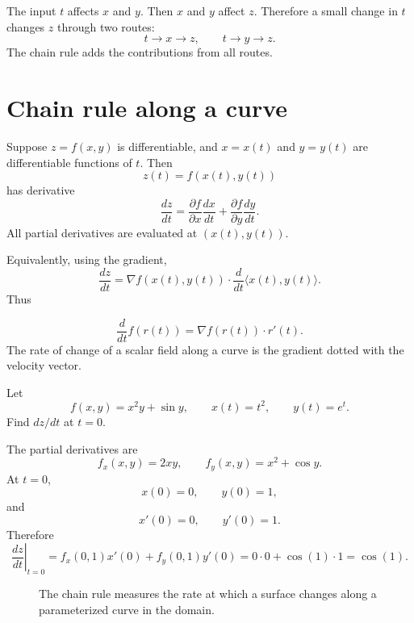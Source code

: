 \documentclass[11pt]{article}
\newcommand{\grad}{\nabla}
\begin{document}
The input $t$ affects $x$ and $y$. Then $x$ and $y$ affect $z$. Therefore a small change in $t$ changes $z$ through two routes:
\[
t\to x\to z,\qquad t\to y\to z.
\]
The chain rule adds the contributions from all routes.

\section{Chain rule along a curve}

Suppose $z=f(x,y)$ is differentiable, and $x=x(t)$ and $y=y(t)$ are differentiable functions of $t$. Then
\[
z(t)=f(x(t),y(t))
\]
has derivative
\[
\frac{dz}{dt}=\frac{\partial f}{\partial x}\frac{dx}{dt}+\frac{\partial f}{\partial y}\frac{dy}{dt}.
\]
All partial derivatives are evaluated at $(x(t),y(t))$.

Equivalently, using the gradient,
\[
\frac{dz}{dt}=\grad f(x(t),y(t))\cdot \frac{d}{dt}\langle x(t),y(t)\rangle.
\]
Thus
\begin{formulabox}
\[
\boxed{\frac{d}{dt}f(r(t))=\grad f(r(t))\cdot r'(t)}.
\]
The rate of change of a scalar field along a curve is the gradient dotted with the velocity vector.
\end{formulabox}

\begin{workedexample}
Let
\[
f(x,y)=x^2y+\sin y,\qquad x(t)=t^2,\qquad y(t)=e^t.
\]
Find $dz/dt$ at $t=0$.

The partial derivatives are
\[
f_x(x,y)=2xy,\qquad f_y(x,y)=x^2+\cos y.
\]
At $t=0$,
\[
x(0)=0,\qquad y(0)=1,
\]
and
\[
x'(0)=0,\qquad y'(0)=1.
\]
Therefore
\[
\left.\frac{dz}{dt}\right|_{t=0}=f_x(0,1)x'(0)+f_y(0,1)y'(0)
=0\cdot 0+\cos(1)\cdot 1=\cos(1).
\]
\end{workedexample}

\begin{figure}[H]
\centering
{}
\caption{The chain rule measures the rate at which a surface changes along a parameterized curve in the domain.}
\end{figure}
\end{document}

